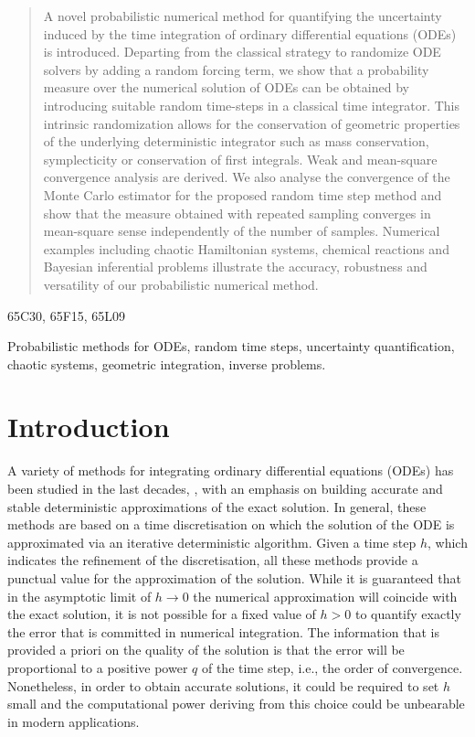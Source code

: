 \documentclass[final,onefignum,onetabnum]{siamonline171218}
\begin{document}
\maketitle	

\begin{abstract} 
A novel probabilistic numerical method for  quantifying the uncertainty induced by the time integration of ordinary differential equations (ODEs) is introduced. Departing from the classical strategy to randomize ODE solvers by adding a random forcing term, we show that a probability measure over the numerical solution of ODEs can be obtained by introducing suitable random time-steps in a classical time integrator.
This  intrinsic randomization allows for the conservation of geometric properties of the underlying deterministic integrator such as mass conservation, symplecticity or conservation of first integrals. Weak and mean-square convergence analysis are derived. We also analyse the convergence of the Monte Carlo estimator for the proposed random time step method and show that the measure obtained with repeated sampling converges in mean-square sense independently of the number of samples. Numerical examples including chaotic Hamiltonian systems, chemical reactions and Bayesian inferential problems illustrate the accuracy, robustness and versatility of our probabilistic numerical method.
\end{abstract}

\begin{AMS} 65C30, 65F15, 65L09  \end{AMS}

\begin{keywords} Probabilistic methods for ODEs, random time steps, uncertainty quantification, chaotic systems, geometric integration, inverse problems. \end{keywords}

\section{Introduction} 
A variety of methods for integrating ordinary differential equations (ODEs) has been studied in the last decades, \cite{HNW93, HaW96, HLW06}, with an emphasis on building accurate and stable deterministic approximations of the exact solution. In general, these methods are based on a time discretisation on which the solution of the ODE is approximated via an iterative deterministic algorithm. Given a time step $h$, which indicates the refinement of the discretisation, all these methods provide a punctual value for the approximation of the solution. While it is guaranteed that in the asymptotic limit of $h \to 0$ the numerical approximation will coincide with the exact solution, it is not possible for a fixed value of $h > 0$ to quantify exactly the error that is committed in numerical integration. The information that is provided a priori on the quality of the solution is that the error will be proportional to a positive power $q$ of the time step, i.e., the order of convergence. Nonetheless, in order to obtain accurate solutions, it could be required to set $h$ small and the computational power deriving from this choice could be unbearable in modern applications.
\end{document}
